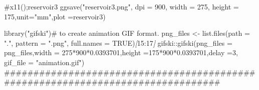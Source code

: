 \documentclass[
]{article}
\newenvironment{Shaded}{\begin{snugshade}}{\end{snugshade}}
\newcommand{\CommentTok}[1]{\textcolor[rgb]{0.56,0.35,0.01}{\textit{#1}}}
\newcommand{\NormalTok}[1]{#1}
\newcommand{\OtherTok}[1]{\textcolor[rgb]{0.56,0.35,0.01}{#1}}
\begin{document}
\begin{Shaded}
\begin{Highlighting}[]
\NormalTok{\#x11();reservoir3}
\NormalTok{ggsave("reservoir3.png", dpi = 900,   width = 275,}
\NormalTok{       height = 175,unit="mm",plot =reservoir3)}
       
\NormalTok{library("gifski")\# to create animation GIF format.}
\NormalTok{png\_files \textless{}{-} list.files(path = ".", pattern = ".png", full.names = TRUE)}\CommentTok{[}\OtherTok{15:17}\CommentTok{]}
\NormalTok{gifski::gifski(png\_files = png\_files,width = 275*900*0.0393701,height =175*900*0.0393701,delay =3, gif\_file = "animation.gif")}
\NormalTok{\#\#\#\#\#\#\#\#\#\#\#\#\#\#\#\#\#\#\#\#\#\#\#\#\#\#\#\#\#\#\#\#\#\#\#\#\#\#\#\#\#\#\#\#\#\#\#\#\#\#\#\#\#\#\#\#\#\#\#\#\#\#\#\#\#\#\#\#\#\#\#\#\#\#\#\#\#\#\#\#}
\end{Highlighting}
\end{Shaded}
\end{document}
